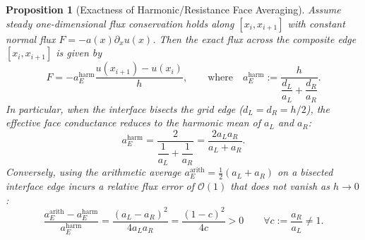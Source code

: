 \documentclass[11pt,a4paper]{article}
\newtheorem{proposition}[theorem]{Proposition}
\theoremstyle{definition}
\theoremstyle{remark}
\begin{document}
\begin{proposition}[Exactness of Harmonic/Resistance Face Averaging]
	\label{prop:harmonic}
	Assume steady one-dimensional flux conservation holds along $[x_i, x_{i+1}]$ with constant normal flux $F = -a(x)\partial_x u(x)$. Then the exact flux across the composite edge $[x_i, x_{i+1}]$ is given by
	\begin{equation}
		F = -a_E^{\text{harm}} \frac{u(x_{i+1}) - u(x_i)}{h}, \qquad \text{where} \quad a_E^{\text{harm}} := \frac{h}{\dfrac{d_L}{a_L} + \dfrac{d_R}{a_R}}.
		\label{eq:resistor_general}
	\end{equation}
	In particular, when the interface bisects the grid edge ($d_L = d_R = h/2$), the effective face conductance reduces to the harmonic mean of $a_L$ and $a_R$:
	\begin{equation}
		a_E^{\text{harm}} = \frac{2}{\dfrac{1}{a_L} + \dfrac{1}{a_R}} = \frac{2a_L a_R}{a_L + a_R}.
		\label{eq:harmonic_mean}
	\end{equation}
	Conversely, using the arithmetic average $a_E^{\text{arith}} = \frac{1}{2}(a_L + a_R)$ on a bisected interface edge incurs a relative flux error of $\mathcal{O}(1)$ that does not vanish as $h \to 0$:
	\begin{equation}
		\frac{a_E^{\text{arith}} - a_E^{\text{harm}}}{a_E^{\text{harm}}} = \frac{(a_L - a_R)^2}{4a_L a_R} = \frac{(1 - c)^2}{4c} > 0 \qquad \forall c := \frac{a_R}{a_L} \ne 1.
		\label{eq:arith_flux_error}
	\end{equation}
\end{proposition}
\end{document}
